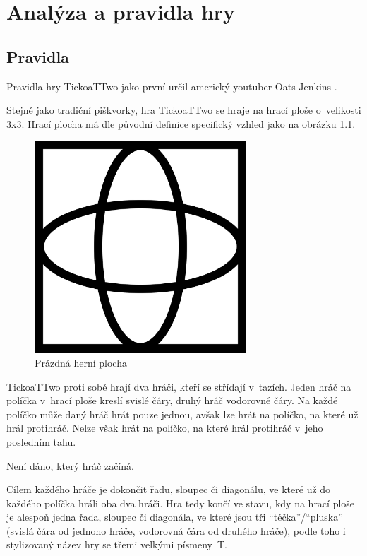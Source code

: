 \chapter{Analýza a pravidla hry}

\section{Pravidla}
Pravidla hry TickoaTTwo jako první určil americký youtuber Oats Jenkins \cite{jenkins22}.

Stejně jako tradiční piškvorky, hra TickoaTTwo se hraje na hrací ploše
o~velikosti 3x3. Hrací plocha má dle původní definice specifický vzhled jako
na obrázku \ref{fig:empty-board}.

\begin{figure}[h]
    \centering
    \includegraphics[width=300px]{img/empty-board.png}
    \caption[Prázdná herní plocha]{Prázdná herní plocha\footnotemark}
    \label{fig:empty-board}
\end{figure}


TickoaTTwo proti sobě hrají dva hráči, kteří se střídají v~tazích. Jeden hráč
na políčka v~hrací ploše kreslí svislé čáry, druhý hráč vodorovné čáry. Na
každé políčko může daný hráč hrát pouze jednou, avšak lze hrát na políčko, na
které už hrál protihráč. Nelze však hrát na políčko, na které hrál protihráč
v~jeho posledním tahu.

Není dáno, který hráč začíná.

Cílem každého hráče je dokončit řadu, sloupec či diagonálu, ve které už do
každého políčka hráli oba dva hráči. Hra tedy končí ve stavu, kdy na hrací
ploše je alespoň jedna řada, sloupec či diagonála, ve které jsou tři
\enquote{téčka}/\enquote{pluska} (svislá čára od jednoho hráče, vodorovná čára
od druhého hráče), podle toho i stylizovaný název hry se třemi velkými
písmeny~T.



